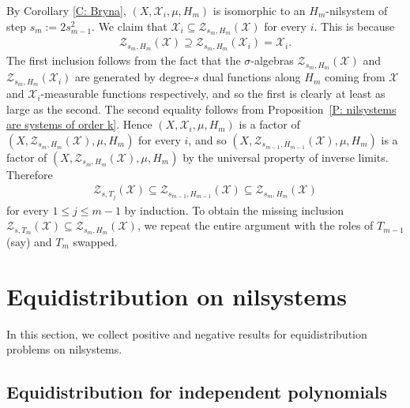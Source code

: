 \documentclass[11pt]{amsart}
\theoremstyle{definition}
\newcommand{\CX}{{\mathcal X}}
\newcommand{\CZ}{{\mathcal Z}}
\newcommand{\1}{{\mathbf{1}}}
\begin{document}
By Corollary \ref{C: Bryna}, $(X,\mathcal{X}_{i},\mu,H_m)$ is isomorphic to an $H_m$-nilsystem of step $s_m:=2s_{m-1}^2$. 
We claim that $\mathcal{X}_{i}\subseteq \CZ_{s_m,H_m}(\CX)$ for every $i$. This is because
\begin{align*}
    \CZ_{s_m,H_m}(\mathcal{X})\supseteq \CZ_{s_m,H_m}(\mathcal{X}_{i}){=\mathcal{X}_{i}}.
\end{align*}
The first inclusion follows from the fact that the $\sigma$-algebras $\CZ_{s_m,H_m}(\mathcal{X})$ and $\CZ_{s_m,H_m}(\mathcal{X}_i)$ are generated by degree-$s$ dual functions along $H_m$ coming from $\CX$ and $\CX_i$-measurable functions respectively, and so the first is clearly at least as large as the second. The second equality follows from Proposition~\ref{P: nilsystems are systems of order k}. Hence  $(X,\mathcal{X}_{i},\mu,H_{m})$ is a factor of $(X,\CZ_{s_m,H_m}(\CX),\mu,H_{m})$ for every $i$, and so $(X,\CZ_{s_{m-1},H_{m-1}}(\CX),\mu,H_{m})$ is a factor of $(X,\CZ_{s_m,H_m}(\CX),\mu,H_{m})$ by the universal property of inverse limits. Therefore
\begin{align*}
    \CZ_{s,T_j}(\CX)\subseteq \CZ_{s_{m-1}, H_{m-1}}(\CX)\subseteq \CZ_{s_m, H_m}(\CX)
\end{align*}
for every $1\leq j\leq m-1$ by induction. To obtain the missing inclusion $\CZ_{s,T_m}(\CX)\subseteq \CZ_{s_m,H_m}(\CX)$, we repeat the entire argument with the roles of $T_{m-1}$ (say) and $T_m$ swapped.




    \section{Equidistribution on nilsystems}\label{S: equidistribution}
In this section, we collect positive and negative results for equidistribution problems on nilsystems.

\subsection{Equidistribution for independent polynomials}
\end{document}
